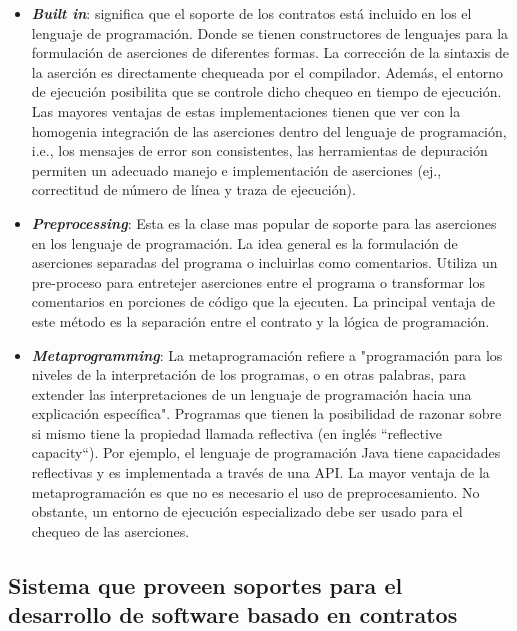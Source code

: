\begin{itemize}
 \item \textbf{\textit{Built in}}: significa que el soporte de los contratos está
incluido en los el lenguaje de programación. Donde se tienen constructores de lenguajes para
la formulación de aserciones de diferentes formas. La corrección de la
sintaxis de la aserción es directamente chequeada por el compilador. Además,
el entorno de ejecución posibilita que se controle dicho chequeo en tiempo de
ejecución. Las mayores ventajas de estas implementaciones tienen que ver con la
homogenia integración de las aserciones dentro del lenguaje de
programación, i.e., los mensajes de error son consistentes, las herramientas de depuración
permiten un adecuado manejo e implementación de aserciones (ej., correctitud de número de línea y traza de ejecución).


\item \textbf{\textit{Preprocessing}}: Esta es la clase mas popular de soporte para las
aserciones en los lenguaje de programación. La idea general es la formulación
de aserciones separadas del programa o incluirlas como comentarios. Utiliza un
pre-proceso para entretejer aserciones entre el programa o transformar los
comentarios en porciones de código que la ejecuten. La principal ventaja de
este método es la separación entre el contrato y la lógica de programación.


\item \textbf{\textit{Metaprogramming}}: La metaprogramación refiere a 
"programación para los niveles de la interpretación de los
programas, o en otras palabras, para extender las interpretaciones de un
lenguaje de programación hacia una explicación específica"\cite{Temp1}.
Programas que tienen la posibilidad de razonar sobre si mismo tiene la
propiedad llamada reflectiva (en inglés ``reflective capacity``). Por ejemplo,
el lenguaje de programación Java tiene capacidades reflectivas y es
implementada a través de una API. La mayor ventaja de la metaprogramación es
que no es necesario el uso de preprocesamiento. No obstante, un entorno de
ejecución especializado debe ser usado para el chequeo de las aserciones.


\end{itemize}


\subsection{Sistema que proveen soportes para el desarrollo de software
basado en contratos} \label{sec:sistemasca}


